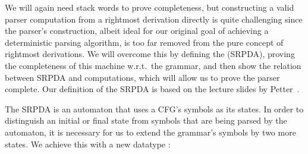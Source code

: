 \begin{isabellebody}
\begin{isamarkuptext}
We will again need stack words to prove completeness, but constructing a valid parser computation 
from a rightmost derivation directly is quite challenging since the parser's construction, albeit
ideal for our original goal of achieving a deterministic parsing algorithm, is too far removed from 
the pure concept of rightmost derivations. We will overcome this by defining the
 (SRPDA), proving the completeness of this machine w.r.t.\
the grammar, and then show the relation between SRPDA and  computations, which will allow
us to prove the parser complete. Our definition of the SRPDA is based on the lecture slides by
Petter~\cite{Petter}.

The SRPDA is an automaton that uses a CFG's symbols as its states. In order to distinguish an
initial or final state from symbols that are being parsed by the automaton, it is necessary for us
to extend the grammar's symbols by two more states. We achieve this with a new datatype
\isa{srpda{\isacharunderscore}{\kern0pt}state}:
\begin{quote}
\end{quote}


\end{isamarkuptext}
\end{isabellebody}
